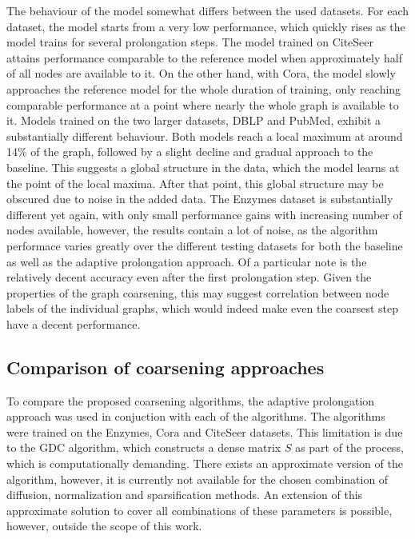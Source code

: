 The behaviour of the model somewhat differs between the used datasets. For each dataset, the model starts from a very low performance, which quickly rises as the model trains for several prolongation steps. The model trained on CiteSeer attains performance comparable to the reference model when approximately half of all nodes are available to it. On the other hand, with Cora, the model slowly approaches the reference model for the whole duration of training, only reaching comparable performance at a point where nearly the whole graph is available to it. Models trained on the two larger datasets, DBLP and PubMed, exhibit a substantially different behaviour. Both models reach a local maximum at around 14\% of the graph, followed by a slight decline and gradual approach to the baseline. This suggests a global structure in the data, which the model learns at the point of the local maxima. After that point, this global structure may be obscured due to noise in the added data. The Enzymes dataset is substantially different yet again, with only small performance gains with increasing number of nodes available, however, the results contain a lot of noise, as the algorithm performace varies greatly over the different testing datasets for both the baseline as well as the adaptive prolongation approach. Of a particular note is the relatively decent accuracy even after the first prolongation step. Given the properties of the graph coarsening, this may suggest correlation between node labels of the individual graphs, which would indeed make even the coarsest step have a decent performance.


\subsection{Comparison of coarsening approaches}

To compare the proposed coarsening algorithms, the adaptive prolongation approach was used in conjuction with each of the algorithms. The algorithms were trained on the Enzymes, Cora and CiteSeer datasets. This limitation is due to the GDC algorithm, which constructs a dense matrix \( S \) as part of the process, which is computationally demanding. There exists an approximate version of the algorithm, however, it is currently not available for the chosen combination of diffusion, normalization and sparsification methods. An extension of this approximate solution to cover all combinations of these parameters is possible, however, outside the scope of this work.

